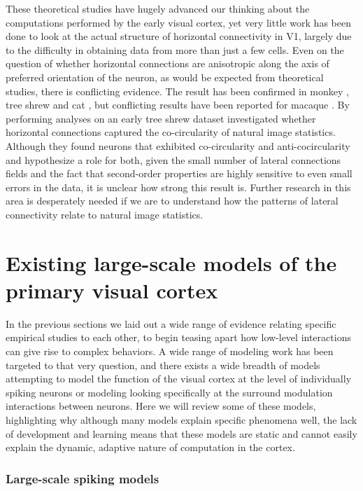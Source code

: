 These theoretical studies have hugely advanced our thinking about the
computations performed by the early visual cortex, yet very little
work has been done to look at the actual structure of horizontal
connectivity in V1, largely due to the difficulty in obtaining data
from more than just a few cells. Even on the question of whether
horizontal connections are anisotropic along the axis of preferred
orientation of the neuron, as would be expected from theoretical
studies, there is conflicting evidence. The result has been confirmed
in monkey \citep{Sincich2001}, tree shrew \citep{Bosking1997} and cat
\citep{Schmidt1997}, but conflicting results have been reported for
macaque \citep{Angelucci2002}. By performing analyses on an early tree
shrew dataset \cite{Hunt2011} investigated whether horizontal
connections captured the co-circularity of natural image
statistics. Although they found neurons that exhibited co-circularity
and anti-cocircularity and hypothesize a role for both, given the
small number of lateral connections fields and the fact that
second-order properties are highly sensitive to even small errors in
the data, it is unclear how strong this result is. Further research in
this area is desperately needed if we are to understand how the
patterns of lateral connectivity relate to natural image statistics.

\section{Existing large-scale models of the primary visual cortex}

In the previous sections we laid out a wide range of evidence
relating specific empirical studies to each other, to begin teasing
apart how low-level interactions can give rise to complex behaviors. A
wide range of modeling work has been targeted to that very
question, and there exists a wide breadth of models attempting to model
the function of the visual cortex at the level of individually spiking
neurons or modeling looking specifically at the surround modulation
interactions between neurons. Here we will review some of these
models, highlighting why although many models explain specific
phenomena well, the lack of development and learning means that these
models are static and cannot easily explain the dynamic, adaptive
nature of computation in the cortex.

\subsubsection{Large-scale spiking models} \label{LargeModels}


